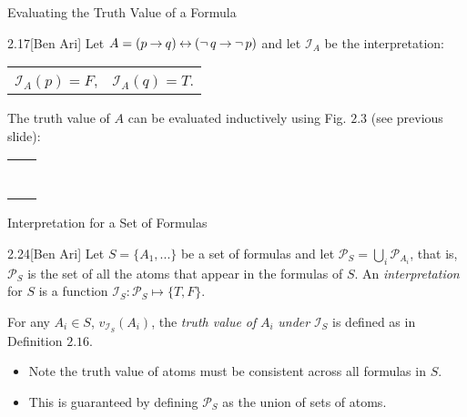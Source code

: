 \begin{wideslide}[bm=,toc=]{Evaluating the Truth Value of a Formula}
\begin{ex}{2.17}[Ben Ari]
Let $A = (p \mathbin{\rightarrow} q) \mathbin{\leftrightarrow} (\mathop{\neg} q \mathbin{\rightarrow} \mathop{\neg} p)$ and let $\mathcal{I}_A$ be
the interpretation:
\begin{center}
\begin{tabular}{ c c }
$\mathcal{I}_A(p) = F$, & $\mathcal{I}_A(q) = T$.
\end{tabular}
\end{center}
The truth value of $A$ can be evaluated inductively using Fig. $2.3$ (see previous
    slide):
\begin{center}
\begin{tabular}{ l l }
\onslide{2-}{$v_\mathcal{I}(p)$}                                     & \onslide{3-}{$= \mathcal{I}_A(p) = F$}\\
\onslide{4-}{$v_\mathcal{I}(q)$}                                     & \onslide{5-}{$= \mathcal{I}_A(q) = T$} \\
\onslide{6-}{$v_\mathcal{I}(p \imp q)$}                              & \onslide{7-}{$= T$} \\
\onslide{8-}{$v_\mathcal{I}(\ngg q)$}                                & \onslide{9-}{$= F$} \\
\onslide{10-}{$v_\mathcal{I}(\ngg p)$}                               & \onslide{11-}{$= T$} \\
\onslide{12-}{$v_\mathcal{I}(\ngg q \imp \ngg p)$}                   & \onslide{13-}{$= T$} \\
\onslide{14-}{$v_\mathcal{I}((p \imp q) \eqv (\ngg q \imp \ngg p))$} & \onslide{15-}{$= T$} \\
\end{tabular}
\end{center}\end{ex}
\end{wideslide}

\begin{wideslide}[bm=,toc=]{Interpretation for a Set of Formulas}
\begin{defn}{2.24}[Ben Ari]
Let $S = \{A_1,...\}$ be a set of formulas and let $\mathcal{P}_S = \bigcup_i
\mathcal{P}_{A_i}$, that is, $\mathcal{P}_S$ is the set of all the atoms that
appear in the formulas of $S$. An \emph{interpretation} for $S$ is a function
$\mathcal{I}_S:\mathcal{P}_S \mapsto \{T,F\}$.
\end{defn}
For any $A_i \in S$, $v_{\mathcal{I}_S}(A_i)$, the \emph{truth value of} $A_i$
\emph{under} $\mathcal{I}_S$ is defined as in Definition $2.16$.

\begin{itemize}
\item Note the truth value of atoms must be consistent across all formulas in $S$.
\item This is guaranteed by defining $\mathcal{P}_S$ as the union of sets of
atoms. 
\end{itemize}
\end{wideslide}

